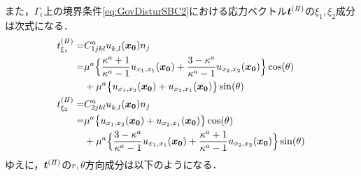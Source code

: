 また，$\Gamma_\epsilon$上の境界条件\eqref{eq:GovDisturSBC2}における応力ベクトル$\bm{t}^{(I\hspace{-.15em}I)}$の$\xi_1,\xi_2$成分は次式になる．
\begin{align}
	t_{\xi_1}^{(I\hspace{-.15em}I)}=&C_{1jkl}^{a}u_{k,l}^{}(\bm{x_{0}})n_{j}
		\nonumber
		\\
		=&\mu^a\Bigl\{\frac{\kappa^a+1}{\kappa^a-1} u_{x_{1},x_{1}}(\bm{x_{0}})
		+\frac{3-\kappa^a}{\kappa^a-1} u_{x_{2},x_{2}}(\bm{x_{0}})\Bigr\}\cos(\theta)
		\nonumber
		\\
		&+\mu^a\bigl\{u_{x_{1},x_{2}}(\bm{x_{0}})+u_{x_{2},x_{1}}(\bm{x_{0}})\bigr\}\sin(\theta)
	\\
	t_{\xi_2}^{(I\hspace{-.15em}I)}=&C_{2jkl}^{a}u_{k,l}^{}(\bm{x_{0}})n_{j}
		\nonumber
		\\
		=&\mu^a \bigl\{u_{x_{1},x_{2}}(\bm{x_{0}})+u_{x_{2},x_{1}}(\bm{x_{0}})\bigr\}\cos(\theta)
		\nonumber
		\\
		&+\mu^a\Bigl\{ \frac{3-\kappa^a}{\kappa^a-1} u_{x_{1},x_{1}}(\bm{x_{0}})
		+\frac{\kappa^a+1}{\kappa^a-1} u_{x_{2},x_{2}}(\bm{x_{0}})\Bigr\}\sin(\theta)
\end{align}
ゆえに，$\bm{t}^{(I\hspace{-.15em}I)}$の$r,\theta$方向成分は以下のようになる．
